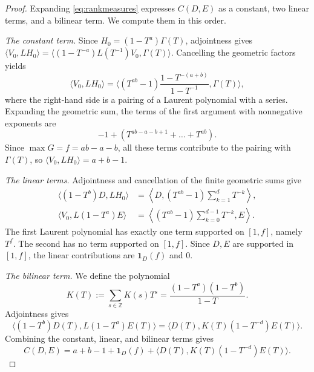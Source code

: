 \documentclass[12pt,reqno]{amsart}
\numberwithin{equation}{section}
\theoremstyle{definition}
\theoremstyle{remark}
\theoremstyle{plain}
\newcommand{\ZZ}{\mathbb Z}
\newcommand{\one}{\mathbf1}
\begin{document}
\begin{proof}
Expanding \eqref{eq:rankmeasures} expresses $C(D,E)$ as a constant,
two linear terms, and a bilinear term.  We compute them in this order.

\medskip
\noindent
\emph{The constant term.}
Since $H_0=(1-T^a)\Gamma(T)$, adjointness gives
$\langle V_0,LH_0\rangle=\langle(1-T^{-a})L(T^{-1})V_0,\Gamma(T)\rangle$.
Cancelling the geometric factors yields
\[ \langle V_0, LH_0\rangle = \langle (T^{ab}-1)\frac{1-T^{-(a+b)}}{1-T^{-1}},\Gamma(T)\rangle,\]
where the right-hand side is a pairing of a Laurent polynomial with a series.
Expanding the geometric sum, the terms of the first argument with
nonnegative exponents are
\[ -1 + (T^{ab-a-b+1}+\dots+T^{ab}).\]
Since $\max G=f=ab-a-b$, all these terms contribute to the pairing with $\Gamma(T)$, so $\langle V_0,LH_0\rangle=a+b-1$.
\medskip

\noindent
\emph{The linear terms.}
Adjointness and cancellation of the finite geometric sums give
\begin{align*}
 \langle(1-T^b)D,LH_0\rangle
   &=\left\langle D,(T^{ab}-1)\sum_{k=1}^{d}T^{-k}\right\rangle,\\
 \langle V_0,L(1-T^a)E\rangle
   &=\left\langle (T^{ab}-1)\sum_{k=0}^{d-1}T^{-k},E\right\rangle.
\end{align*}
The first Laurent polynomial has exactly one term supported on $[1,f]$,
namely $T^f$.  The second has no term supported on $[1,f]$.
Since $D,E$ are supported in $[1,f]$, the linear contributions are
$\one_D(f)$ and $0$.
\medskip

\noindent
\emph{The bilinear term.}
We define the polynomial
\[
 K(T):=\sum_{s\in\ZZ}K(s)T^s=\frac{(1-T^a)(1-T^b)}{1-T}.
\]
Adjointness gives
\[ \langle (1-T^b)D(T),L(1-T^a)E(T)\rangle = \langle D(T), K(T)(1-T^{-d})E(T)\rangle.\]
Combining the constant, linear, and bilinear terms gives
\begin{equation}\label{eq:cross-simplified}
    C(D,E)=a+b-1+\one_D(f)+\langle D(T), K(T)(1-T^{-d})E(T)\rangle.
\end{equation}


\end{proof}
\end{document}
